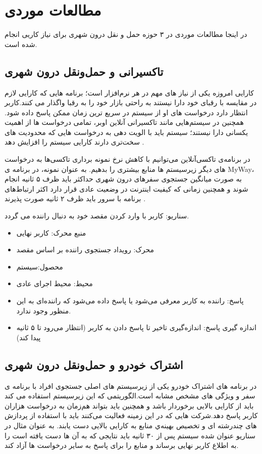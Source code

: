 \section{مطالعات موردی}

در اینجا مطالعات موردی در ۳ حوزه حمل و نقل درون شهری برای نیاز کاریی انجام شده است. 
\subsection{تاکسیرانی و حمل‌و‌نقل درون شهری}
کارایی امروزه یکی از نیاز های مهم در هر نرم‌افزار است؛ برنامه هایی که کارایی لازم در مقایسه با رقبای خود دارا نیستند به راحتی بازار خود را به رقبا واگذار می کنند.کاربر انتظار دارد درخواست های او از سیستم در سریع ترین زمان ممکن پاسخ داده شود.
همچنین در سیستم‌هایی مانند تاکسیرانی آنلاین اوبر، تمامی درخواست ها از اهمیت یکسانی دارا نیستند؛ سیستم باید با الویت دهی به درخواست هایی که محدودیت های سخت‌تری دارند کارایی سیستم را افزایش دهد \cite{uber_priority} .

در برنامه‌ی تاکسی‌آنلاین می‌توانیم با کاهش نرخ نمونه برداری تاکسی‌ها به درخواست های دیگر زیرسیستم ها منابع بیشتری را بدهیم.
به عنوان نمونه، در برنامه ی MyWay، به صورت میانگین جستجوی سفرهای درون شهری حداکثر باید ظرف ۵ ثانیه انجام شوند و همچنین زمانی که کیفیت اینترنت در وضعیت عادی قرار دارد اکثر ارتباط‌های برنامه با سرور باید ظرف ۲ ثانیه صورت پذیرند \cite{myway_req}.

سناریو: کاربر با وارد کردن مقصد خود به دنبال راننده می گردد. 
\begin{itemize}
\item
منبع محرک: کاربر نهایی
\item
محرک: رویداد جستجوی راننده بر اساس مقصد
\item
محصول:سیستم
\item
محیط: محیط اجرای عادی
\item
پاسخ: راننده به کاربر معرفی می‌شود یا پاسخ داده می‌شود که راننده‌ای به این منظور وجود ندارد.
\item
اندازه گیری پاسخ: اندازه‌گیری تاخیر تا پاسخ دادن به کاربر  (انتظار می‌رود تا ۵ ثانیه پیدا کند)
\end{itemize}



\subsection{اشتراک خودرو و حمل‌و‌نقل درون شهری}
در برنامه های اشتراک خودرو یکی از زیرسیستم های اصلی جستجوی افراد با برنامه ی سفر و ویژگی های مشخص مشابه است.الگوریتمی که این زیرسیستم استفاده می کند باید از کارایی بالایی برخوردار باشد و همچنین باید بتواند هم‌زمان به درخواست هزاران کاربر پاسخ دهد.شرکت هایی که در این زمینه فعالیت می‌کنند باید با استفاده از پردازش های چندرشته ای و تخصیص بهینه‌ي منابع به کارایی بالایی دست یابند. به عنوان مثال در سناریو عنوان شده سیستم پس از ۳۰ ثانیه باید نتایجی که به آن ها دست یافته است را به اطلاع کاربر نهایی برساند و منابع را برای پاسخ به سایر درخواست ها آزاد کند.


